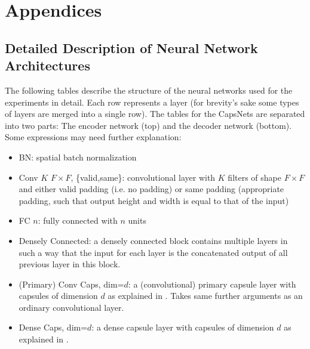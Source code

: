 \appendix
\section*{Appendices}
\renewcommand{\thesubsection}{\Alph{subsection}}

\subsection{Detailed Description of Neural Network Architectures}
\label{lab:networks}

The following tables describe the structure of the neural networks used for the experiments in detail. Each row represents a layer (for brevity's sake some types of layers are merged into a single row).
The tables for the CapsNets are separated into two parts: The encoder network (top) and the decoder network (bottom).
Some expressions may need further explanation:

\begin{itemize}
	\item BN: spatial batch normalization
	\item Conv $K$ $F \times F$, \{valid,same\}: convolutional layer with $K$ filters of shape $F \times F$ and either valid padding (i.e. no padding) or same padding (appropriate padding, such that output height and width is equal to that of the input)
	\item FC $n$: fully connected with $n$ units
	\item Densely Connected: a densely connected block \citep{denselyconnected} contains multiple layers in such a way that the input for each layer is the concatenated output of all previous layer in this block.
	\item (Primary) Conv Caps, dim=$d$: a (convolutional) primary capsule layer with capsules of dimension $d$ as explained in . Takes same further arguments as an ordinary convolutional layer.
	\item Dense Caps, dim=$d$: a dense capsule layer with capsules of dimension $d$ as explained in .
\end{itemize}

